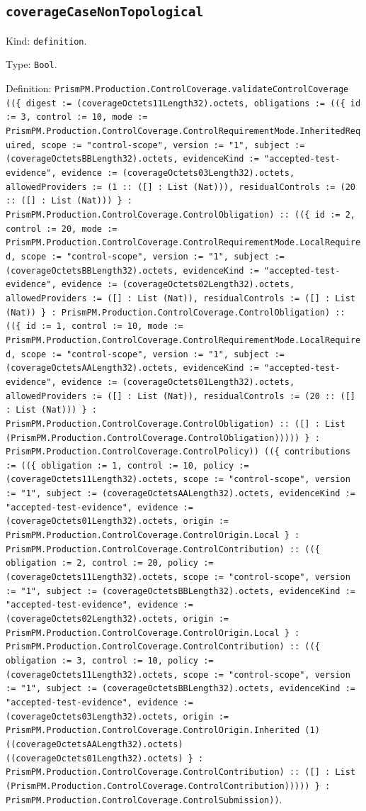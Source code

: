 \documentclass[11pt]{article}
\begin{document}
\subsection*{\texttt{coverageCaseNonTopological}}
\noindent Kind: \texttt{definition}.\par
\noindent Type: \texttt{Bool}.\par
\noindent Definition: \texttt{PrismPM.Production.ControlCoverage.validateControlCoverage ((\{ digest := (coverageOctets11Length32).octets, obligations := ((\{ id := 3, control := 10, mode := PrismPM.Production.ControlCoverage.ControlRequirementMode.InheritedRequired, scope := "control-scope", version := "1", subject := (coverageOctetsBBLength32).octets, evidenceKind := "accepted-test-evidence", evidence := (coverageOctets03Length32).octets, allowedProviders := (1 :: ([] : List (Nat))), residualControls := (20 :: ([] : List (Nat))) \} : PrismPM.Production.ControlCoverage.ControlObligation) :: ((\{ id := 2, control := 20, mode := PrismPM.Production.ControlCoverage.ControlRequirementMode.LocalRequired, scope := "control-scope", version := "1", subject := (coverageOctetsBBLength32).octets, evidenceKind := "accepted-test-evidence", evidence := (coverageOctets02Length32).octets, allowedProviders := ([] : List (Nat)), residualControls := ([] : List (Nat)) \} : PrismPM.Production.ControlCoverage.ControlObligation) :: ((\{ id := 1, control := 10, mode := PrismPM.Production.ControlCoverage.ControlRequirementMode.LocalRequired, scope := "control-scope", version := "1", subject := (coverageOctetsAALength32).octets, evidenceKind := "accepted-test-evidence", evidence := (coverageOctets01Length32).octets, allowedProviders := ([] : List (Nat)), residualControls := (20 :: ([] : List (Nat))) \} : PrismPM.Production.ControlCoverage.ControlObligation) :: ([] : List (PrismPM.Production.ControlCoverage.ControlObligation))))) \} : PrismPM.Production.ControlCoverage.ControlPolicy)) ((\{ contributions := ((\{ obligation := 1, control := 10, policy := (coverageOctets11Length32).octets, scope := "control-scope", version := "1", subject := (coverageOctetsAALength32).octets, evidenceKind := "accepted-test-evidence", evidence := (coverageOctets01Length32).octets, origin := PrismPM.Production.ControlCoverage.ControlOrigin.Local \} : PrismPM.Production.ControlCoverage.ControlContribution) :: ((\{ obligation := 2, control := 20, policy := (coverageOctets11Length32).octets, scope := "control-scope", version := "1", subject := (coverageOctetsBBLength32).octets, evidenceKind := "accepted-test-evidence", evidence := (coverageOctets02Length32).octets, origin := PrismPM.Production.ControlCoverage.ControlOrigin.Local \} : PrismPM.Production.ControlCoverage.ControlContribution) :: ((\{ obligation := 3, control := 10, policy := (coverageOctets11Length32).octets, scope := "control-scope", version := "1", subject := (coverageOctetsBBLength32).octets, evidenceKind := "accepted-test-evidence", evidence := (coverageOctets03Length32).octets, origin := PrismPM.Production.ControlCoverage.ControlOrigin.Inherited (1) ((coverageOctetsAALength32).octets) ((coverageOctets01Length32).octets) \} : PrismPM.Production.ControlCoverage.ControlContribution) :: ([] : List (PrismPM.Production.ControlCoverage.ControlContribution))))) \} : PrismPM.Production.ControlCoverage.ControlSubmission))}.\par
\end{document}
